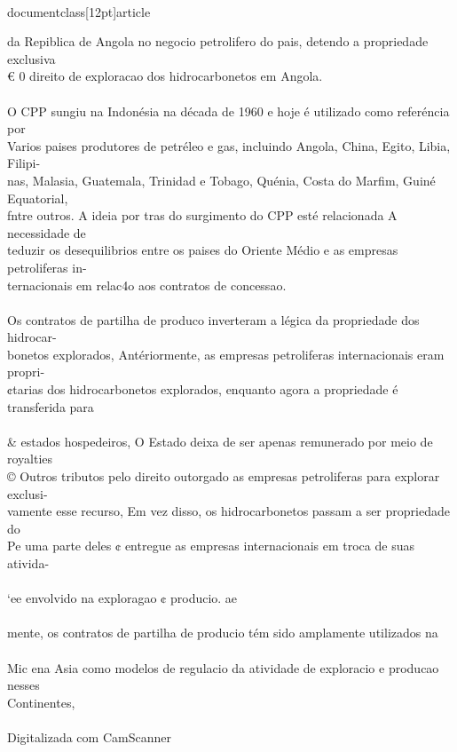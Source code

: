 \\documentclass[12pt]{article}
\begin{document}
da Repiblica de Angola no negocio petrolifero do pais, detendo a propriedade exclusiva\\
€ 0 direito de exploracao dos hidrocarbonetos em Angola.\\
\\
O CPP sungiu na Indonésia na década de 1960 e hoje é utilizado como referéncia por\\
Varios paises produtores de petréleo e gas, incluindo Angola, China, Egito, Libia, Filipi-\\
nas, Malasia, Guatemala, Trinidad e Tobago, Quénia, Costa do Marfim, Guiné Equatorial,\\
fntre outros. A ideia por tras do surgimento do CPP esté relacionada A necessidade de\\
teduzir os desequilibrios entre os paises do Oriente Médio e as empresas petroliferas in-\\
ternacionais em relac4o aos contratos de concessao.\\
\\
Os contratos de partilha de produco inverteram a légica da propriedade dos hidrocar-\\
bonetos explorados, Antériormente, as empresas petroliferas internacionais eram propri-\\
¢tarias dos hidrocarbonetos explorados, enquanto agora a propriedade é transferida para\\
\\& estados hospedeiros, O Estado deixa de ser apenas remunerado por meio de royalties\\
© Outros tributos pelo direito outorgado as empresas petroliferas para explorar exclusi-\\
vamente esse recurso, Em vez disso, os hidrocarbonetos passam a ser propriedade do\\
Pe uma parte deles ¢ entregue as empresas internacionais em troca de suas ativida-\\
\\
‘ee envolvido na exploragao ¢ producio. ae\\
\\
mente, os contratos de partilha de producio tém sido amplamente utilizados na\\
\\
Mic ena Asia como modelos de regulacio da atividade de exploracio e producao nesses\\
Continentes,\\
\\
Digitalizada com CamScanner\\
\end{document}
